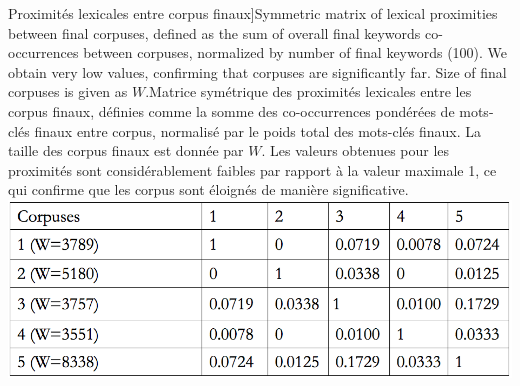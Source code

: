 


\begin{table}
\caption[Stationary lexical proximities][Proximités lexicales entre corpus finaux]{Symmetric matrix of lexical proximities between final corpuses, defined as the sum of overall final keywords co-occurrences between corpuses, normalized by number of final keywords (100). We obtain very low values, confirming that corpuses are significantly far. Size of final corpuses is given as $W$.\label{tab:quantepistemo:lexical}}{Matrice symétrique des proximités lexicales entre les corpus finaux, définies comme la somme des co-occurrences pondérées de mots-clés finaux entre corpus, normalisé par le poids total des mots-clés finaux. La taille des corpus finaux est donnée par $W$. Les valeurs obtenues pour les proximités sont considérablement faibles par rapport à la valeur maximale 1, ce qui confirme que les corpus sont éloignés de manière significative.\label{tab:quantepistemo:lexical}}
\includegraphics[width=0.8\linewidth]{Figures/QuantEpistemo/corpusesDistances}
\end{table}









